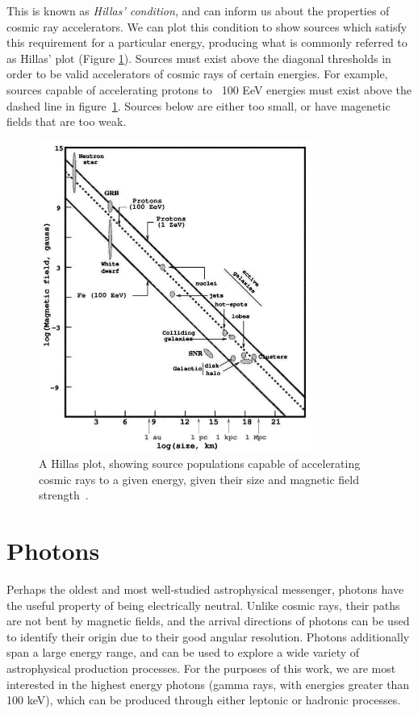 This is known as \textit{Hillas' condition}, and can inform us about the properties of cosmic ray accelerators. We can plot this condition to show sources which satisfy this requirement for a particular energy, producing what is commonly referred to as Hillas' plot (Figure \ref{fig:hillasplot}). Sources must exist above the diagonal thresholds in order to be valid accelerators of cosmic rays of certain energies. For example, sources capable of accelerating protons to ~100 EeV energies must exist above the dashed line in figure~\ref{fig:hillasplot}. Sources below are either too small, or have magenetic fields that are too weak.    

\begin{figure}[h]
\centering
\includegraphics[width=0.8\textwidth]{figs/HillasPlot.jpg}
\caption{A Hillas plot, showing source populations capable of accelerating cosmic rays to a given energy, given their size and magnetic field strength~\cite{hillasplotsrc}.}
\label{fig:hillasplot}
\end{figure}


\section{Photons}
Perhaps the oldest and most well-studied astrophysical messenger, photons have the useful property of being electrically neutral. Unlike cosmic rays, their paths are not bent by magnetic fields, and the arrival directions of photons can be used to identify their origin due to their good angular resolution. Photons additionally span a large energy range, and can be used to explore a wide variety of astrophysical production processes. For the purposes of this work, we are most interested in the highest energy photons (gamma rays, with energies greater than 100 keV), which can be produced through either leptonic or hadronic processes.

